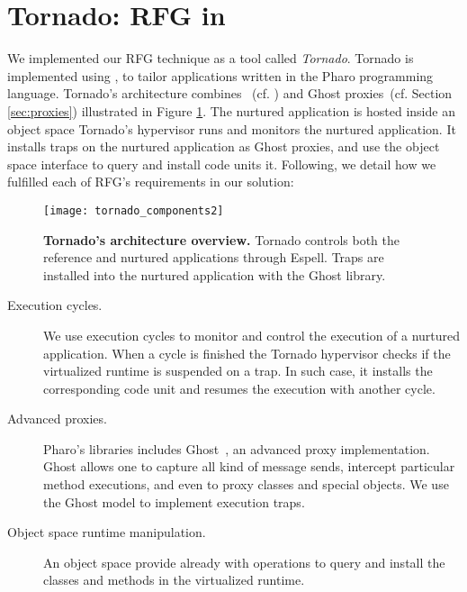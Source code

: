 \section{Tornado: RFG in \Vtt} \label{sec:rfg_implementation}

We implemented our RFG technique as a tool called \emph{Tornado}. Tornado is implemented using \Vtt, to tailor applications written in the Pharo programming language.
Tornado's architecture combines \Vtt~(cf. ) and Ghost proxies~(cf. Section \ref{sec:proxies}) illustrated in Figure \ref{fig:tornado_code units}. The nurtured application is hosted inside an object space  Tornado's hypervisor runs and monitors the nurtured application. It installs traps on the nurtured application as Ghost proxies, and use the object space interface to query and install code units it. Following, we detail how we fulfilled each of RFG's requirements in our solution:

\begin{figure}[ht]
\begin{center}
\texttt{[image: tornado\_components2]}
\caption{\small\textbf{Tornado's architecture overview.} Tornado controls both the reference and nurtured applications through Espell. Traps are installed into the nurtured application with the Ghost library.\label{fig:tornado_code units}}
\end{center}
\end{figure}

\begin{description}
\item[Execution cycles.] We use \Vtt execution cycles to monitor and control the execution of a nurtured application. When a cycle is finished the Tornado hypervisor checks if the virtualized runtime is suspended on a trap. In such case, it installs the corresponding code unit and resumes the execution with another cycle.

\item[Advanced proxies.] Pharo's libraries includes Ghost~\cite{Mart11a}, an advanced proxy implementation. Ghost allows one to capture all kind of message sends, intercept particular method executions, and even to proxy classes and special objects. We use the Ghost model to implement execution traps.

\item[Object space runtime manipulation.] An object space provide already with operations to query and install the classes and methods in the virtualized runtime.

\end{description}

